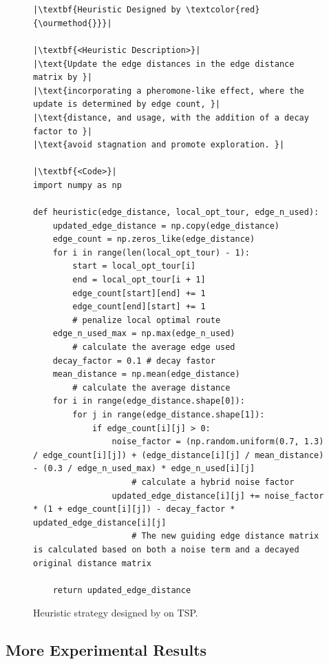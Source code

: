 \begin{figure}[ht]
\caption{Heuristic strategy designed by \ourmethod{} on TSP. }~\label{fig:heuristic_tsp}

\begin{minipage}{0.99\linewidth}
\begin{lstlisting}

|\textbf{Heuristic Designed by \textcolor{red}{\ourmethod{}}}|

|\textbf{<Heuristic Description>}|
|\text{Update the edge distances in the edge distance matrix by }|
|\text{incorporating a pheromone-like effect, where the update is determined by edge count, }|
|\text{distance, and usage, with the addition of a decay factor to }|
|\text{avoid stagnation and promote exploration. }|

|\textbf{<Code>}|
import numpy as np

def heuristic(edge_distance, local_opt_tour, edge_n_used):
    updated_edge_distance = np.copy(edge_distance)
    edge_count = np.zeros_like(edge_distance)
    for i in range(len(local_opt_tour) - 1):
        start = local_opt_tour[i]
        end = local_opt_tour[i + 1]
        edge_count[start][end] += 1
        edge_count[end][start] += 1
        # penalize local optimal route
    edge_n_used_max = np.max(edge_n_used) 
        # calculate the average edge used
    decay_factor = 0.1 # decay fastor
    mean_distance = np.mean(edge_distance) 
        # calculate the average distance
    for i in range(edge_distance.shape[0]):
        for j in range(edge_distance.shape[1]):
            if edge_count[i][j] > 0:
                noise_factor = (np.random.uniform(0.7, 1.3) / edge_count[i][j]) + (edge_distance[i][j] / mean_distance) - (0.3 / edge_n_used_max) * edge_n_used[i][j]
                    # calculate a hybrid noise factor
                updated_edge_distance[i][j] += noise_factor * (1 + edge_count[i][j]) - decay_factor * updated_edge_distance[i][j]
                    # The new guiding edge distance matrix is calculated based on both a noise term and a decayed original distance matrix

    return updated_edge_distance
\end{lstlisting}
\end{minipage}
\end{figure}

\subsection{More Experimental Results}~\label{more_results_tsp}

